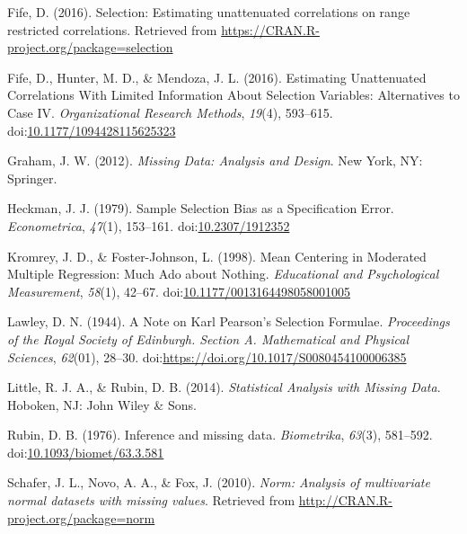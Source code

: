 \documentclass[english,man]{apa6}
\theoremstyle{definition}
\theoremstyle{definition}
\theoremstyle{remark}
\begin{document}
\hypertarget{ref-fife_selection:_2016}{}
Fife, D. (2016). Selection: Estimating unattenuated correlations on
range restricted correlations. Retrieved from
\url{https://CRAN.R-project.org/package=selection}

\hypertarget{ref-fife_estimating_2016}{}
Fife, D., Hunter, M. D., \& Mendoza, J. L. (2016). Estimating
Unattenuated Correlations With Limited Information About Selection
Variables: Alternatives to Case IV. \emph{Organizational Research
Methods}, \emph{19}(4), 593--615.
doi:\href{https://doi.org/10.1177/1094428115625323}{10.1177/1094428115625323}

\hypertarget{ref-graham_missing_2012}{}
Graham, J. W. (2012). \emph{Missing Data: Analysis and Design}. New
York, NY: Springer.

\hypertarget{ref-heckman_sample_1979}{}
Heckman, J. J. (1979). Sample Selection Bias as a Specification Error.
\emph{Econometrica}, \emph{47}(1), 153--161.
doi:\href{https://doi.org/10.2307/1912352}{10.2307/1912352}

\hypertarget{ref-kromrey_mean_1998}{}
Kromrey, J. D., \& Foster-Johnson, L. (1998). Mean Centering in
Moderated Multiple Regression: Much Ado about Nothing. \emph{Educational
and Psychological Measurement}, \emph{58}(1), 42--67.
doi:\href{https://doi.org/10.1177/0013164498058001005}{10.1177/0013164498058001005}

\hypertarget{ref-lawley_note_1944}{}
Lawley, D. N. (1944). A Note on Karl Pearson's Selection Formulae.
\emph{Proceedings of the Royal Society of Edinburgh. Section A.
Mathematical and Physical Sciences}, \emph{62}(01), 28--30.
doi:\href{https://doi.org/https://doi.org/10.1017/S0080454100006385}{https://doi.org/10.1017/S0080454100006385}

\hypertarget{ref-little_statistical_2014}{}
Little, R. J. A., \& Rubin, D. B. (2014). \emph{Statistical Analysis
with Missing Data}. Hoboken, NJ: John Wiley \& Sons.

\hypertarget{ref-rubin_inference_1976}{}
Rubin, D. B. (1976). Inference and missing data. \emph{Biometrika},
\emph{63}(3), 581--592.
doi:\href{https://doi.org/10.1093/biomet/63.3.581}{10.1093/biomet/63.3.581}

\hypertarget{ref-schafer_norm:_2010}{}
Schafer, J. L., Novo, A. A., \& Fox, J. (2010). \emph{Norm: Analysis of
multivariate normal datasets with missing values}. Retrieved from
\url{http://CRAN.R-project.org/package=norm}
\end{document}
